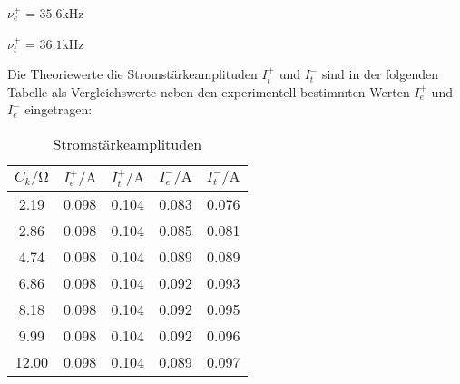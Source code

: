 $\nu_e^+$ = $35.6 \si{\kilo\hertz}$

$\nu_t^+$ = $36.1 \si{\kilo\hertz}$

Die Theoriewerte die Stromstärkeamplituden $I_t^+$ und $I_t^-$ sind in der folgenden Tabelle als Vergleichswerte
neben den experimentell bestimmten Werten $I_e^+$ und $I_e^-$ eingetragen: 

\begin{table}
    \centering
    \caption{Stromstärkeamplituden}
    \label{tab:I}
    \begin{tabular}{c c c c c}
    \toprule
    $C_k / \si{\ohm}$ & $I_e^+ / \si{\ampere}$ & $I_t^+ / \si{\ampere}$ & $I_e^- / \si{\ampere}$ & $I_t^- / \si{\ampere}$ \\
    \midrule
     2.19 & 0.098 & 0.104 & 0.083 & 0.076 \\
     2.86 & 0.098 & 0.104 & 0.085 & 0.081 \\
     4.74 & 0.098 & 0.104 & 0.089 & 0.089 \\
     6.86 & 0.098 & 0.104 & 0.092 & 0.093 \\
     8.18 & 0.098 & 0.104 & 0.092 & 0.095 \\
     9.99 & 0.098 & 0.104 & 0.092 & 0.096 \\
    12.00 & 0.098 & 0.104 & 0.089 & 0.097 \\
    \bottomrule
    \end{tabular}
\end{table}




